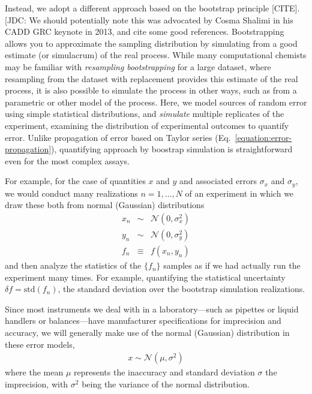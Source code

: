\documentclass[aps,pre,twocolumn,nofootinbib,superscriptaddress,linenumbers]{revtex4-1}
\begin{document}
Instead, we adopt a different approach based on the bootstrap principle {\color{red}[CITE]}.
{\color{red}[JDC: We should potentially note this was advocated by Cosma Shalimi in his CADD GRC keynote in 2013, and cite some good references.}
Bootstrapping allows you to approximate the sampling distribution by simulating from a good estimate (or simulacrum) of the real process.
While many computational chemists may be familiar with \emph{resampling bootstrapping} for a large dataset, where resampling from the dataset with replacement provides this estimate of the real process, it is also possible to simulate the process in other ways, such as from a parametric or other model of the process.
Here, we model sources of random error using simple statistical distributions, and \emph{simulate} multiple replicates of the experiment, examining the distribution of experimental outcomes to quantify error.
Unlike propagation of error based on Taylor series (Eq.~\ref{equation:error-propagation}), quantifying approach by boostrap simulation is straightforward even for the most complex assays.

For example, for the case of  quantities $x$ and $y$ and associated errors $\sigma_x$ and $\sigma_y$, we would conduct many realizations $n = 1, \ldots, N$ of an experiment in which we draw these both from normal (Gaussian) distributions
\begin{eqnarray}
x_n &\sim& \mathcal{N}(0, \sigma^2_x) \nonumber \\
y_n &\sim& \mathcal{N}(0, \sigma^2_y) \nonumber \\
f_n &\equiv& f(x_n, y_n)
\end{eqnarray}
and then analyze the statistics of the $\{f_n\}$ samples as if we had actually run the experiment many times.
For example, quantifying the statistical uncertainty $\delta f = \mathrm{std}(f_n)$, the standard deviation over the bootstrap simulation realizations.

Since most instruments we deal with in a laboratory---such as pipettes or liquid handlers or balances---have manufacturer specifications for imprecision and accuracy, we will generally make use of the normal (Gaussian) distribution in these error models,
\begin{eqnarray}
x \sim \mathcal{N}(\mu, \sigma^2) \label{equation:Gaussian}
\end{eqnarray}
where the mean $\mu$ represents the inaccuracy and standard deviation $\sigma$ the imprecision, with $\sigma^2$ being the variance of the normal distribution.
\end{document}
